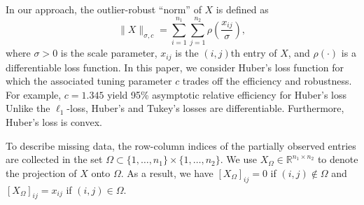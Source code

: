 In our approach, the outlier-robust “norm” of $X$ is defined as
\[
\|X\|_{\sigma,c} = \sum_{i=1}^{n_1} \sum_{j=1}^{n_2} \rho\left(\frac{x_{ij}}{\sigma}\right),
\]
where $\sigma > 0$ is the scale parameter, $x_{ij}$ is the $(i, j)$th entry of $X$, and $\rho(\cdot)$ is a differentiable loss function. In this paper, we consider Huber’s loss function for which the associated tuning parameter $c$ trades off the efficiency and robustness. For example, $c = 1.345$ yield 95\% asymptotic relative efficiency for Huber’s loss Unlike the $\ell_1$-loss, Huber’s and Tukey’s losses are differentiable. Furthermore, Huber’s loss is convex.

To describe missing data, the row-column indices of the partially observed entries are collected in the set $\Omega \subset \{1, \ldots, n_1\} \times \{1, \ldots, n_2\}$. We use $X_{\Omega} \in \mathbb{R}^{n_1 \times n_2}$ to denote the projection of $X$ onto $\Omega$. As a result, we have $[X_{\Omega}]_{ij} = 0$ if $(i, j) \notin \Omega$ and $[X_{\Omega}]_{ij} = x_{ij}$ if $(i, j) \in \Omega$.

